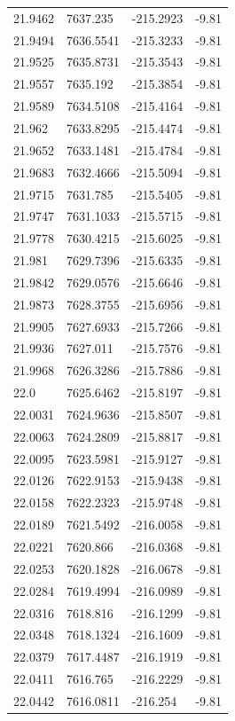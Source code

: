 \begin{table}[H]
\begin{tabular}{llll}
21.9462 & 7637.235 & -215.2923 & -9.81 \\
21.9494 & 7636.5541 & -215.3233 & -9.81 \\
21.9525 & 7635.8731 & -215.3543 & -9.81 \\
21.9557 & 7635.192 & -215.3854 & -9.81 \\
21.9589 & 7634.5108 & -215.4164 & -9.81 \\
21.962 & 7633.8295 & -215.4474 & -9.81 \\
21.9652 & 7633.1481 & -215.4784 & -9.81 \\
21.9683 & 7632.4666 & -215.5094 & -9.81 \\
21.9715 & 7631.785 & -215.5405 & -9.81 \\
21.9747 & 7631.1033 & -215.5715 & -9.81 \\
21.9778 & 7630.4215 & -215.6025 & -9.81 \\
21.981 & 7629.7396 & -215.6335 & -9.81 \\
21.9842 & 7629.0576 & -215.6646 & -9.81 \\
21.9873 & 7628.3755 & -215.6956 & -9.81 \\
21.9905 & 7627.6933 & -215.7266 & -9.81 \\
21.9936 & 7627.011 & -215.7576 & -9.81 \\
21.9968 & 7626.3286 & -215.7886 & -9.81 \\
22.0 & 7625.6462 & -215.8197 & -9.81 \\
22.0031 & 7624.9636 & -215.8507 & -9.81 \\
22.0063 & 7624.2809 & -215.8817 & -9.81 \\
22.0095 & 7623.5981 & -215.9127 & -9.81 \\
22.0126 & 7622.9153 & -215.9438 & -9.81 \\
22.0158 & 7622.2323 & -215.9748 & -9.81 \\
22.0189 & 7621.5492 & -216.0058 & -9.81 \\
22.0221 & 7620.866 & -216.0368 & -9.81 \\
22.0253 & 7620.1828 & -216.0678 & -9.81 \\
22.0284 & 7619.4994 & -216.0989 & -9.81 \\
22.0316 & 7618.816 & -216.1299 & -9.81 \\
22.0348 & 7618.1324 & -216.1609 & -9.81 \\
22.0379 & 7617.4487 & -216.1919 & -9.81 \\
22.0411 & 7616.765 & -216.2229 & -9.81 \\
22.0442 & 7616.0811 & -216.254 & -9.81 \\

\end{tabular}
\end{table}
